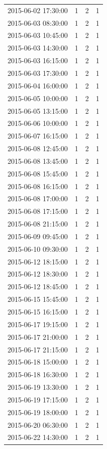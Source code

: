 \begin{tabular}{lrrr}
2015-06-02 17:30:00 & 1 & 2 & 1 \\
2015-06-03 08:30:00 & 1 & 2 & 1 \\
2015-06-03 10:45:00 & 1 & 2 & 1 \\
2015-06-03 14:30:00 & 1 & 2 & 1 \\
2015-06-03 16:15:00 & 1 & 2 & 1 \\
2015-06-03 17:30:00 & 1 & 2 & 1 \\
2015-06-04 16:00:00 & 1 & 2 & 1 \\
2015-06-05 10:00:00 & 1 & 2 & 1 \\
2015-06-05 13:15:00 & 1 & 2 & 1 \\
2015-06-06 10:00:00 & 1 & 2 & 1 \\
2015-06-07 16:15:00 & 1 & 2 & 1 \\
2015-06-08 12:45:00 & 1 & 2 & 1 \\
2015-06-08 13:45:00 & 1 & 2 & 1 \\
2015-06-08 15:45:00 & 1 & 2 & 1 \\
2015-06-08 16:15:00 & 1 & 2 & 1 \\
2015-06-08 17:00:00 & 1 & 2 & 1 \\
2015-06-08 17:15:00 & 1 & 2 & 1 \\
2015-06-08 21:15:00 & 1 & 2 & 1 \\
2015-06-09 09:45:00 & 1 & 2 & 1 \\
2015-06-10 09:30:00 & 1 & 2 & 1 \\
2015-06-12 18:15:00 & 1 & 2 & 1 \\
2015-06-12 18:30:00 & 1 & 2 & 1 \\
2015-06-12 18:45:00 & 1 & 2 & 1 \\
2015-06-15 15:45:00 & 1 & 2 & 1 \\
2015-06-15 16:15:00 & 1 & 2 & 1 \\
2015-06-17 19:15:00 & 1 & 2 & 1 \\
2015-06-17 21:00:00 & 1 & 2 & 1 \\
2015-06-17 21:15:00 & 1 & 2 & 1 \\
2015-06-18 15:00:00 & 1 & 2 & 1 \\
2015-06-18 16:30:00 & 1 & 2 & 1 \\
2015-06-19 13:30:00 & 1 & 2 & 1 \\
2015-06-19 17:15:00 & 1 & 2 & 1 \\
2015-06-19 18:00:00 & 1 & 2 & 1 \\
2015-06-20 06:30:00 & 1 & 2 & 1 \\
2015-06-22 14:30:00 & 1 & 2 & 1 \\

\end{tabular}
